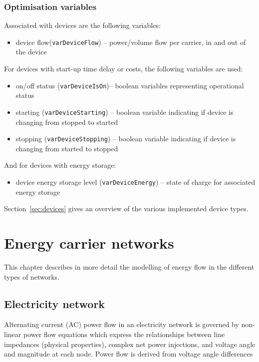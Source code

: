 \documentclass[12pt]{article}
\begin{document}
\subsubsection{Optimisation variables}

Associated with devices are the following variables:
\begin{itemize}
	\item device flow(\texttt{varDeviceFlow}) – power/volume flow per carrier, in and out of the device
\end{itemize}
%
For devices with start-up time delay or costs, the following variables are used:
\begin{itemize}
	\item on/off status (\texttt{varDeviceIsOn})– boolean variables representing operational status
	\item starting (\texttt{varDeviceStarting}) – boolean variable indicating if device is changing from stopped to started 
	\item stopping (\texttt{varDeviceStopping}) – boolean variable indicating if device is changing from started to stopped
\end{itemize}
%
And for devices with energy storage:
\begin{itemize}
	\item device energy storage level (\texttt{varDeviceEnergy}) – state of charge for associated energy storage
\end{itemize}


Section~\ref{sec:devices} gives an overview of the various implemented device types.





\section{Energy carrier networks}
\label{sec:networks}

This chapter describes in more detail the modelling of energy flow in the different types of networks.


\subsection{Electricity network}

Alternating current (AC) power flow in an electricity network is governed by non-linear power flow equations which express the relationships between line impedances (physical properties), complex net power injections, and voltage angle and magnitude at each node. Power flow is derived from voltage angle differences
\end{document}
